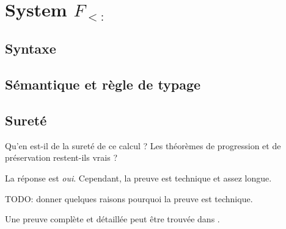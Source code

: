 \chapter{System $F_{<:}$}

\section{Syntaxe}

\section{Sémantique et règle de typage}

\section{Sureté}

Qu'en est-il de la sureté de ce calcul ? Les théorèmes de progression et de
préservation restent-ils vrais ?

La réponse est \textit{oui}. Cependant, la preuve est technique et assez longue.

TODO: donner quelques raisons pourquoi la preuve est technique.

Une preuve complète et détaillée peut être trouvée dans \cite{tapl-bounded-quantification-metatheory}.